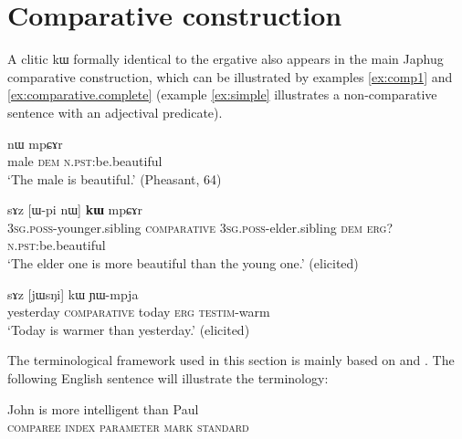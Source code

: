 \documentclass[oldfontcommands,oneside,a4paper,11pt]{article}
\newcommand{\ipa}[1]{{\phon #1}} %
\begin{document}
 

\section{Comparative construction} \label{sec:comparative}

A clitic \ipa{kɯ} formally identical to the ergative also appears in the main Japhug comparative construction, which can be illustrated by   examples \ref{ex:comp1} and \ref{ex:comparative.complete} (example \ref{ex:simple} illustrates a non-comparative sentence with an adjectival predicate).

\begin{exe}
\ex \label{ex:simple}
\gll  \ipa{pʰu}   	\ipa{nɯ}   \ipa{mpɕɤr}     \\
  male \textsc{dem}    \textsc{n.pst:}be.beautiful \\
\glt `The male is   beautiful.' (Pheasant, 64)
\end{exe}

\begin{exe}
\ex \label{ex:comp1}
\gll  \ipa{ɯ-ʁi}   	\ipa{sɤz}   	[\ipa{ɯ-pi}   	\ipa{nɯ}]   	\ipa{\textbf{kɯ}}   	\ipa{mpɕɤr}     \\
\textsc{3sg.poss}-younger.sibling \textsc{comparative} \textsc{3sg.poss}-elder.sibling \textsc{dem} \textsc{erg?}  \textsc{n.pst:}be.beautiful \\
\glt `The elder one is more beautiful than the young one.' (elicited)
\end{exe}
 
 
\begin{exe}
\ex \label{ex:comparative.complete}
\gll \ipa{jɯfɕɯr}   	\ipa{sɤz }   	[\ipa{jɯsŋi}]   	\ipa{kɯ}   	\ipa{ɲɯ-mpja}   \\
yesterday \textsc{comparative} today \textsc{erg} \textsc{testim}-warm \\
\glt `Today is warmer than yesterday.' (elicited)
\end{exe}

The terminological framework used in this section is mainly based on \citet{dixon08comparative} and \citet{stassen11comparative}. The following English sentence will illustrate the  terminology:

\begin{exe}
\ex \label{ex:comp.eng}
\gll  John is more intelligent than Paul \\
\textsc{comparee} { } \textsc{index} \textsc{parameter} \textsc{mark} \textsc{standard}  \\
\end{exe}
\end{document}
